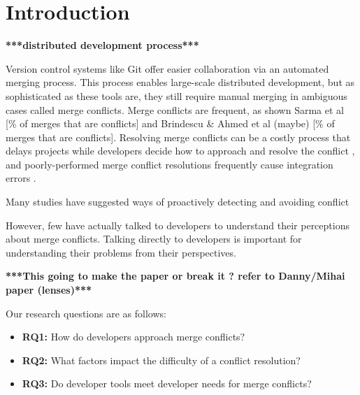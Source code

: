 \section{Introduction}
\textbf{***distributed development process***}



Version control systems like Git offer easier collaboration via an automated merging process. This process enables large-scale distributed development, but as sophisticated as these tools are, they still require manual merging in ambiguous cases called merge conflicts. Merge conflicts are frequent, as shown Sarma et al [\% of merges that are conflicts] and Brindescu \& Ahmed et al (maybe) [\% of merges that are conflicts]. Resolving merge conflicts can be a costly process that delays projects while developers decide how to approach and resolve the conflict \cite{cassandra}, and poorly-performed merge conflict resolutions frequently cause integration errors \cite{bird-branches-conflict}. 


Many studies have suggested ways of proactively detecting and avoiding conflict \cite{Brun2011} \cite{palantir} 


However, few have actually talked to developers to understand their perceptions about merge conflicts. Talking directly to developers is important for understanding their problems from their perspectives.

\textbf{***This going to make the paper or break it ? refer to Danny/Mihai paper (lenses)***}

Our research questions are as follows:
\begin{itemize}
\item\textbf{RQ1:} How do developers approach merge conflicts?\\
\item\textbf{RQ2:} What factors impact the difficulty of a conflict resolution?\\
\item\textbf{RQ3:} Do developer tools meet developer needs for merge conflicts?\\
\end{itemize}